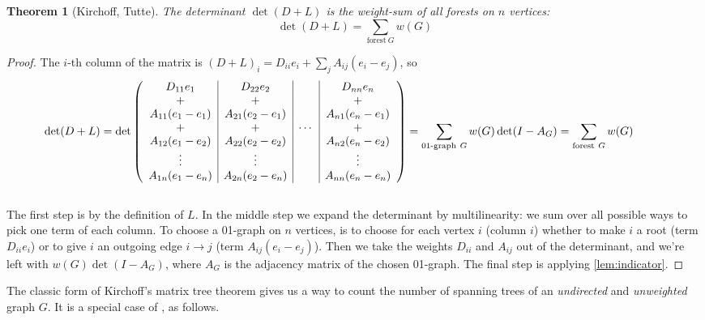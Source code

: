 \documentclass[a4paper, 11pt]{article}
\newtheorem{theorem}{Theorem}[section]
\theoremstyle{definition}
\begin{document}
\begin{theorem}[Kirchoff, Tutte] \label{thm:kirchofftutte}
  The determinant $\det(D + L)$ is the weight-sum of all forests on $n$ vertices:
  \[
    \det(D + L) = \sum_{\text{forest}\ G} w(G)
  \]
\end{theorem}
\begin{proof}
  The $i$-th column of the matrix is $(D + L)_i = D_{ii} e_i + \sum_j A_{ij}(e_i - e_j)$, so \\
  \begin{align*}
    \hspace*{-1cm}
    \det(D + L) = \det \left(
    \begin{array}{c|c|c|c}
      D_{11} e_1         & D_{22} e_2         &        & D_{nn} e_n          \\
      +                  & +                  &        & +                   \\
      A_{11} (e_1 - e_1) & A_{21} (e_2 - e_1) &        & A_{n1} (e_n - e_1)  \\
      +                  & +                  & \cdots & +                   \\
      A_{12} (e_1 - e_2) & A_{22} (e_2 - e_2) &        & A_{n2} (e_n - e_2)  \\
      \vdots             & \vdots             &        & \vdots              \\
      A_{1n} (e_1 - e_n) & A_{2n} (e_2 - e_n) &        & A_{nn} (e_n - e_n)
    \end{array} \right)
    = \sum_{\text{01-graph}\ G} w(G) \det(I - A_G)
    = \sum_{\text{forest}\ G} w(G)
  \end{align*} \\
  The first step is by the definition of $L$. In the middle step we expand the determinant by multilinearity: we sum over all possible ways to pick one term of each column. To choose a 01-graph on $n$ vertices, is to choose for each vertex $i$ (column $i$) whether to make $i$ a root (term $D_{ii} e_i$) or to give $i$ an outgoing edge $i \to j$ (term $A_{ij}(e_i - e_j)$). Then we take the weights $D_{ii}$ and $A_{ij}$ out of the determinant, and we're left with $w(G)\det(I - A_G)$, where $A_G$ is the adjacency matrix of the chosen 01-graph. The final step is applying \cref{lem:indicator}.
\end{proof}

The classic form of Kirchoff's matrix tree theorem gives us a way to count the number of spanning trees of an \emph{undirected} and \emph{unweighted} graph $G$. It is a special case of , as follows.
\end{document}
